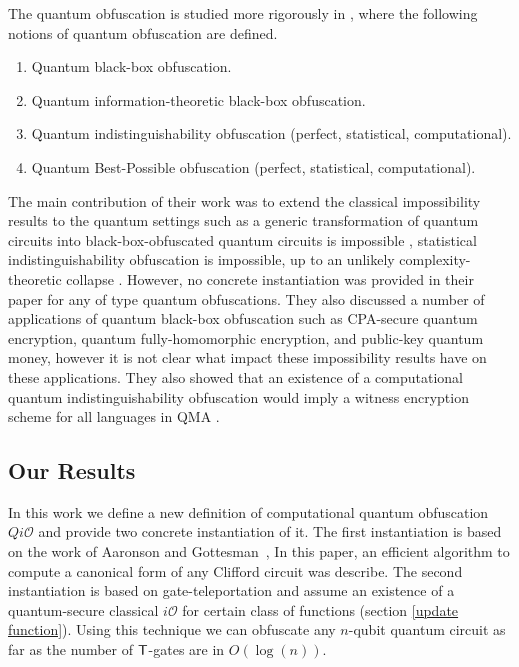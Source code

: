 The quantum obfuscation is studied more rigorously in \cite{AF16a}, where the following notions of quantum obfuscation are defined.
\begin{enumerate}
\item Quantum black-box obfuscation.
\item Quantum information-theoretic black-box obfuscation.
\item Quantum indistinguishability obfuscation (perfect, statistical, computational).
\item Quantum Best-Possible obfuscation (perfect, statistical, computational).
\end{enumerate}

 The main contribution of their work was to extend the classical impossibility results to the quantum settings such as a generic transformation of quantum circuits into black-box-obfuscated quantum circuits is impossible \cite{AF16arxiv},  statistical indistinguishability obfuscation is impossible, up to an unlikely complexity-theoretic collapse \cite{AF16arxiv}. However, no concrete instantiation was provided in their paper for any of type quantum obfuscations. They also discussed a number of applications of quantum black-box obfuscation such as CPA-secure quantum encryption, quantum fully-homomorphic encryption, and public-key quantum money, however it is not clear what impact these impossibility results have on these applications. They also showed that an existence of a computational quantum indistinguishability obfuscation would imply a witness encryption scheme for all languages in QMA \cite{arXiv:1602.01771v1}.


\subsection{Our Results}
In this work we define a new definition of computational quantum obfuscation $Qi\mathcal{O}$ and provide two concrete instantiation of it. The first instantiation is based on the work of Aaronson and Gottesman~\cite{AG04}, In this paper, an efficient algorithm to compute a canonical form of any Clifford circuit was describe. The second instantiation is based on gate-teleportation \cite{} and assume an existence of a quantum-secure classical $i\mathcal{O}$ for certain class of functions (section \ref{update function}). Using this technique we can obfuscate any $n$-qubit quantum circuit as far as the number of ${\sf T}$-gates are in $O(\log(n)).$







